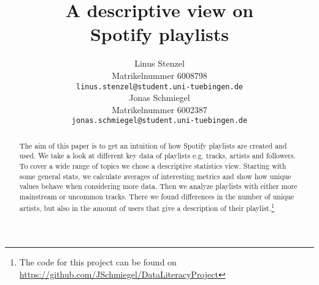 \documentclass{article}
\title{A descriptive view on\\ Spotify playlists}
\author{
  Linus Stenzel\\
  Matrikelnummer 6008798\\
  \texttt{linus.stenzel@student.uni-tuebingen.de} \\
  \And
  Jonas Schmiegel\\
  Matrikelnummer 6002387\\
  \texttt{jonas.schmiegel@student.uni-tuebingen.de} \\
}
\begin{document}
\maketitle

\begin{abstract}
  The aim of this paper is to get an intuition of how Spotify playlists are created and used. We take a look at different key data of playlists e.g. tracks, artists and followers. To cover a wide range of topics we chose a descriptive statistics view. Starting with some general stats, we calculate averages of interesting metrics and show how unique values behave when considering more data. Then we analyze playlists with either more mainstream or uncommon tracks. There we found differences in the number of unique artists, but also in the amount of users that give a description of their playlist.\footnote{The code for this project can be found on \url{https://github.com/JSchmiegel/DataLiteracyProject}}
\end{abstract}









\end{document}
